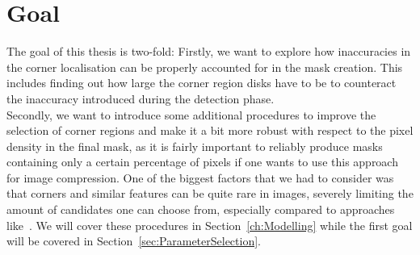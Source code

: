\section{Goal}\label{sec:Goal}

The goal of this thesis is two-fold:
Firstly, we want to explore how inaccuracies in the corner localisation can be properly accounted
for in the mask creation. This includes finding out how large the corner region disks have to be to
counteract the inaccuracy introduced during the detection phase.\\
Secondly, we want to introduce some additional procedures to improve the selection of corner regions
and make it a bit more robust with respect to the pixel density in the final mask, as it is fairly
important to reliably produce masks containing only a certain percentage of pixels if one wants to
use this approach for image compression.
One of the biggest factors that we had to consider was that corners and similar features can be quite 
rare in images, severely limiting the amount of candidates one can choose from, especially compared to
approaches like~\cite{schmaltz09, hoeltgen12}. 
We will cover these procedures in Section~\ref{ch:Modelling} while the first goal will be covered
in Section~\ref{sec:ParameterSelection}.
